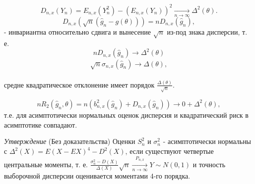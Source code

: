 \[
  D_{n, x}(Y_n) = E_{n, x}(Y_n^2) - (E_{n, x}(Y_n))^2 \xrightarrow[n \to \infty]{} \Delta^2(\theta)
.\]
\[
  D_{n, x}(\sqrt{n}(\hat{g}_n - g(\theta))) = nD_{n, x}(\hat{g}_n)
,\] - инвариантна относительно сдвига и вынесение $\sqrt{n}$ из-под знака дисперсии,
т. е.
\[
  nD_{n, x}(\hat{g}_n) \xrightarrow[]{} \Delta^2(\theta)
\]
\[
  \sqrt{n}\sigma_{n, x}(\hat{g}_n) \xrightarrow[]{} \Delta(\theta)
,\] \\
средне квадратическое отклонение имеет порядок $\frac{\Delta(\theta)}{\sqrt{n}}$.

\[
  nR_2(\hat{g}_n, \theta) = n(b_{n, x}^2(\hat{g}_n) + D_{n, x}(\hat{g}_n)) \xrightarrow[]{} 0 + \Delta^2(\theta)
,\]
т.е. для асимптотически нормальных оценок дисперсия и квадратический риск в асимптотике совпадают.

\textit{Утверждение} (Без доказательства) Оценки $S^2_n$ и $\sigma^2_n$ - асимптотически нормальны с $\Delta^2(X) = E(X - EX)^4 - D^2(X)$, если существуют четвертые центральные моменты,
т. е. $\frac{\sigma^2_n - D(X)}{\Delta(X)}\sqrt{n} \xrightarrow[n \to \infty]{P_{n, x}} Y \sim N(0, 1)$ и точность выборочной дисперсии оценивается моментами 4-го порядка.
